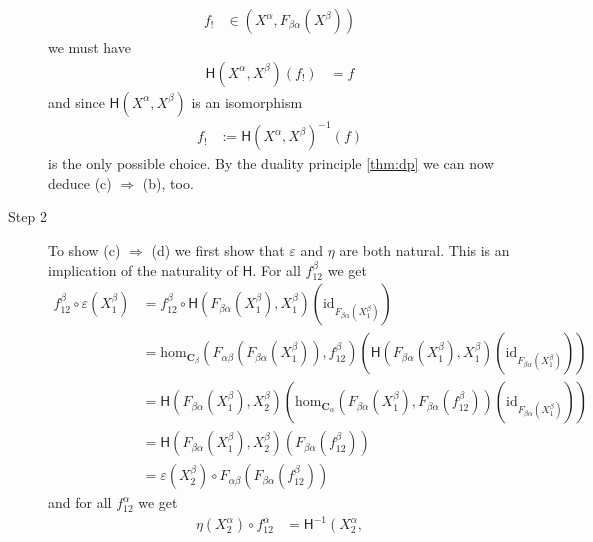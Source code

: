 \begin{prf}
\begin{description}
\begin{align*}
  f_{!}
  &\in
  \left(
    X^{\alpha},
    F_{\beta\alpha}
    \left(
      X^{\beta}
    \right)
  \right)
\end{align*}
we must have
\begin{align*}
  \mathsf{H}(X^{\alpha},X^{\beta})(f_{!})
  &=
  f
\end{align*}
and since $\mathsf{H}(X^{\alpha},X^{\beta})$ is an isomorphism
\begin{align*}
  f_{!}
  &:=
  \mathsf{H}(X^{\alpha},X^{\beta})^{-1}(f)
\end{align*}
is the only possible choice. By the duality principle \ref{thm:dp} we can now deduce {\glqq}(c) $\Rightarrow$ (b){\grqq}, too.
\item[Step 2]
To show {\glqq}(c) $\Rightarrow$ (d){\grqq} we first show that $\varepsilon$ and $\eta$ are both natural. This is an implication of the naturality of $\mathsf{H}$. For all $f_{12}^{\beta}$ we get
\begin{align*}
  f_{12}^{\beta}
  \circ
  \varepsilon(X_{1}^{\beta})
  &=
  f_{12}^{\beta}
  \circ
  \mathsf{H}
  \left(
    F_{\beta\alpha}(X_{1}^{\beta}),
    X_{1}^{\beta}
  \right)
  \left(
    \mathrm{id}_{F_{\beta\alpha}(X_{1}^{\beta})}
  \right)
  \\
  &=
  \mathrm{hom}_{\mathbf{C}_{\beta}}
  \left(
    F_{\alpha\beta}
    \left(
      F_{\beta\alpha}(X_{1}^{\beta})
    \right),
    f_{12}^{\beta}
  \right)
  \left(
    \mathsf{H}
    \left(
      F_{\beta\alpha}(X_{1}^{\beta}),
      X_{1}^{\beta}
    \right)
    \left(
      \mathrm{id}_{F_{\beta\alpha}(X_{1}^{\beta})}
    \right)
  \right)
  \\
  &=
  \mathsf{H}
  \left(
    F_{\beta\alpha}(X_{1}^{\beta}),
    X_{2}^{\beta}
  \right)
  \left(
    \mathrm{hom}_{\mathbf{C}_{\alpha}}
    \left(
      F_{\beta\alpha}(X_{1}^{\beta}),
      F_{\beta\alpha}(f_{12}^{\beta})
    \right)
    \left(
      \mathrm{id}_{F_{\beta\alpha}(X_{1}^{\beta})}
    \right)
  \right)
  \tag{NT}
  \\
  &=
  \mathsf{H}
  \left(
    F_{\beta\alpha}(X_{1}^{\beta}),
    X_{2}^{\beta}
  \right)
  \left(
    F_{\beta\alpha}(f_{12}^{\beta})
  \right)
  \\
  &=
  \varepsilon(X_{2}^{\beta})
  \circ
  F_{\alpha\beta}
  \left(
    F_{\beta\alpha}(f_{12}^{\beta})
  \right)
\end{align*}
and for all $f_{12}^{\alpha}$ we get
\begin{align*}
  \eta(X_{2}^{\alpha})
  \circ
  f_{12}^{\alpha}
  &=
  \mathsf{H}^{-1}
  \left(
    X_{2}^{\alpha},

\end{align*}
\end{description}
\end{prf}
